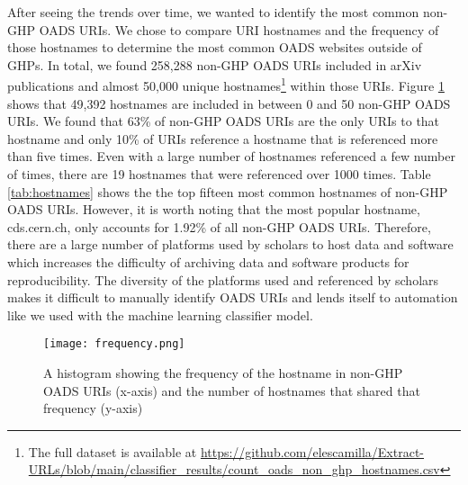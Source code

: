 After seeing the trends over time, we wanted to identify the most common non-GHP OADS URIs. We chose to compare URI hostnames and the frequency of those hostnames to determine the most common OADS websites outside of GHPs. In total, we found 258,288 non-GHP OADS URIs included in arXiv publications and almost 50,000 unique hostnames\footnote{The full dataset is available at \url{https://github.com/elescamilla/Extract-URLs/blob/main/classifier\_results/count\_oads\_non\_ghp\_hostnames.csv}} within those URIs. Figure \ref{fig:frequency} shows that 49,392 hostnames are included in between 0 and 50 non-GHP OADS URIs. We found that 63\% of non-GHP OADS URIs are the only URIs to that hostname and only 10\% of URIs reference a hostname that is referenced more than five times. Even with a large number of hostnames referenced a few number of times, there are 19 hostnames that were referenced over 1000 times. Table \ref{tab:hostnames} shows the the top fifteen most common hostnames of non-GHP OADS URIs. However, it is worth noting that the most popular hostname, cds.cern.ch, only accounts for 1.92\% of all non-GHP OADS URIs. Therefore, there are a large number of platforms used by scholars to host data and software which increases the difficulty of archiving data and software products for reproducibility. The diversity of the platforms used and referenced by scholars makes it difficult to manually identify OADS URIs and lends itself to automation like we used with the machine learning classifier model. 

\begin{figure}
    \centering
    \texttt{[image: frequency.png]}
    \caption{A histogram showing the frequency of the hostname in non-GHP OADS URIs (x-axis) and the number of hostnames that shared that frequency (y-axis)}
    \label{fig:frequency}
\end{figure}

